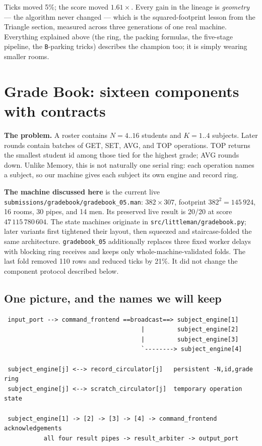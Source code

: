 \documentclass[11pt,a4paper]{article}
\newcommand{\op}[1]{\texttt{#1}}
\begin{document}
Ticks moved 5\%; the score moved $1.61\times$. Every gain in the lineage
is \emph{geometry} --- the algorithm never changed --- which is the
squared-footprint lesson from the Triangle section, measured across three
generations of one real machine. Everything explained above (the ring, the
packing formulas, the five-stage pipeline, the \op{B}-parking tricks)
describes the champion too; it is simply wearing smaller rooms.

\clearpage
\section{Grade Book: sixteen components with contracts}
\label{sec:gradebook}

\textbf{The problem.} A roster contains $N=4..16$ students and $K=1..4$
subjects. Later rounds contain batches of GET, SET, AVG, and TOP operations.
TOP returns the smallest student id among those tied for the highest grade;
AVG rounds down. Unlike Memory, this is not naturally one serial ring:
each operation names a subject, so our machine gives each subject its own
engine and record ring.

\textbf{The machine discussed here} is the current live
\texttt{submissions/gradebook/gradebook\_05.man}: $382\times307$, footprint
$382^2=145\,924$, 16 rooms, 30 pipes, and 14 men. Its preserved live result is
20/20 at score $47\,115\,780\,604$. The state machines originate in
\texttt{src/littleman/gradebook.py}; later variants first tightened their
layout, then squeezed and staircase-folded the same architecture.
\texttt{gradebook\_05} additionally replaces three fixed worker delays with
blocking ring receives and keeps only whole-machine-validated folds. The last
fold removed 110 rows and reduced ticks by 21\%. It did not change the
component protocol described below.

\subsection{One picture, and the names we will keep}

\begin{verbatim}
 input_port --> command_frontend ==broadcast==> subject_engine[1]
                                      |         subject_engine[2]
                                      |         subject_engine[3]
                                      `--------> subject_engine[4]

 subject_engine[j] <--> record_circulator[j]   persistent -N,id,grade ring
 subject_engine[j] <--> scratch_circulator[j]  temporary operation state

 subject_engine[1] -> [2] -> [3] -> [4] -> command_frontend   acknowledgements
           all four result pipes -> result_arbiter -> output_port
\end{verbatim}
\end{document}
